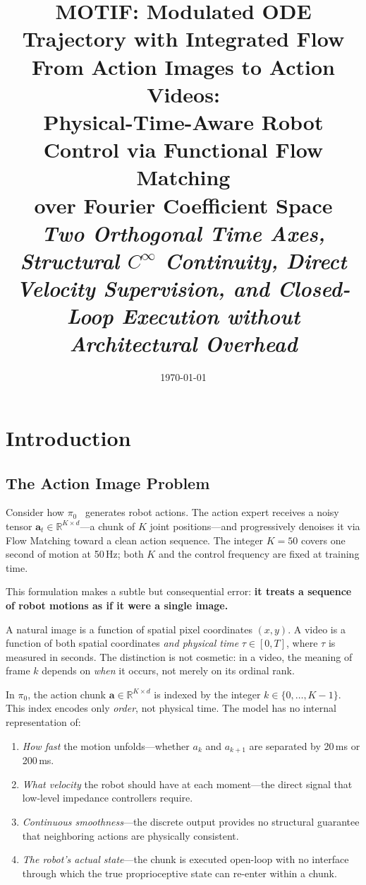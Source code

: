 \documentclass[11pt]{article}
\title{
  \textbf{MOTIF: Modulated ODE Trajectory with Integrated Flow}\\[6pt]
  \large From Action Images to Action Videos:\\
  Physical-Time-Aware Robot Control via Functional Flow Matching\\
  over Fourier Coefficient Space\\[4pt]
  \normalsize\textit{Two Orthogonal Time Axes, Structural $C^\infty$ Continuity,
  Direct Velocity Supervision, and Closed-Loop Execution without Architectural Overhead}
}
\author{}
\date{\today}
\theoremstyle{plain}
\theoremstyle{definition}
\newcommand{\R}{\mathbb{R}}
\newcommand{\tdiff}{t}
\newcommand{\texec}{\tau}
\begin{document}
\maketitle
\tableofcontents
\newpage

\section{Introduction}
\label{sec:intro}

\subsection{The Action Image Problem}

Consider how $\pi_0$~\cite{black2024pi0} generates robot actions.
The action expert receives a noisy tensor
$\mathbf{a}_\tdiff \in \R^{K \times d}$---a chunk of $K$ joint
positions---and progressively denoises it via Flow Matching toward a
clean action sequence.
The integer $K = 50$ covers one second of motion at 50\,Hz;
both $K$ and the control frequency are fixed at training time.

This formulation makes a subtle but consequential error:
\textbf{it treats a sequence of robot motions as if it were a single image.}

A natural image is a function of spatial pixel coordinates $(x, y)$.
A video is a function of both spatial coordinates \emph{and physical time}
$\texec \in [0,T]$, where $\texec$ is measured in seconds.
The distinction is not cosmetic: in a video, the meaning of frame $k$
depends on \emph{when} it occurs, not merely on its ordinal rank.

In $\pi_0$, the action chunk $\mathbf{a} \in \R^{K \times d}$ is indexed by
the integer $k \in \{0,\ldots,K-1\}$.
This index encodes only \emph{order}, not physical time.
The model has no internal representation of:
\begin{enumerate}[leftmargin=2em,noitemsep]
  \item \emph{How fast} the motion unfolds---whether $a_k$ and $a_{k+1}$
    are separated by 20\,ms or 200\,ms.
  \item \emph{What velocity} the robot should have at each moment---the
    direct signal that low-level impedance controllers require.
  \item \emph{Continuous smoothness}---the discrete output provides no
    structural guarantee that neighboring actions are physically consistent.
  \item \emph{The robot's actual state}---the chunk is executed open-loop
    with no interface through which the true proprioceptive state
    can re-enter within a chunk.
\end{enumerate}
\end{document}
